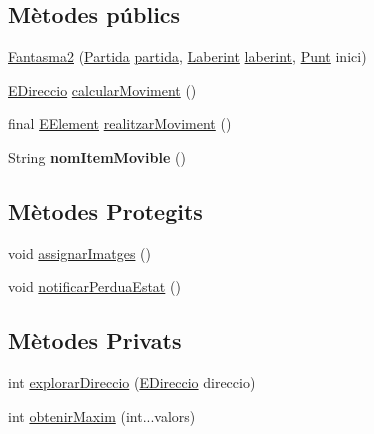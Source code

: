 \subsection*{Mètodes públics}
\begin{DoxyCompactItemize}
\item 
\hyperlink{classlogica_1_1_fantasma2_a0c387e2b93f51714ae84d162fdf05ef0}{Fantasma2} (\hyperlink{classlogica_1_1_partida}{Partida} \hyperlink{classlogica_1_1_item_movible_ace55b4918a7f671f89ed3109c91359e4}{partida}, \hyperlink{classlogica_1_1laberints_1_1_laberint}{Laberint} \hyperlink{classlogica_1_1_item_movible_a97036130b7376d77776427ca126f6fb5}{laberint}, \hyperlink{classlogica_1_1_punt}{Punt} inici)
\item 
\hyperlink{enumlogica_1_1enumeracions_1_1_e_direccio}{E\+Direccio} \hyperlink{classlogica_1_1_fantasma2_a0ea5a98c11778bc3b09f66ea5c7a1db1}{calcular\+Moviment} ()
\item 
final \hyperlink{enumlogica_1_1enumeracions_1_1_e_element}{E\+Element} \hyperlink{classlogica_1_1_fantasma2_a68af5e9cfac40d91de9bf24fc8042ce1}{realitzar\+Moviment} ()
\item 
\hypertarget{classlogica_1_1_fantasma2_a07a2087fbf3959176a4d4b9b81caf660}{String {\bfseries nom\+Item\+Movible} ()}\label{classlogica_1_1_fantasma2_a07a2087fbf3959176a4d4b9b81caf660}

\end{DoxyCompactItemize}
\subsection*{Mètodes Protegits}
\begin{DoxyCompactItemize}
\item 
void \hyperlink{classlogica_1_1_fantasma2_a5ba4c0f99f09122c393203c474fe5562}{assignar\+Imatges} ()
\item 
void \hyperlink{classlogica_1_1_fantasma2_a7a334328a30cc606d6b995904fffb3c7}{notificar\+Perdua\+Estat} ()
\end{DoxyCompactItemize}
\subsection*{Mètodes Privats}
\begin{DoxyCompactItemize}
\item 
int \hyperlink{classlogica_1_1_fantasma2_af2469a459af82e7a2beddd1cd52a10e6}{explorar\+Direccio} (\hyperlink{enumlogica_1_1enumeracions_1_1_e_direccio}{E\+Direccio} direccio)
\item 
int \hyperlink{classlogica_1_1_fantasma2_a42e8ef51ddf6036914e26e20d2cb216e}{obtenir\+Maxim} (int...\+valors)
\end{DoxyCompactItemize}
